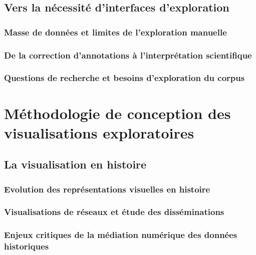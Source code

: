 \documentclass[a4paper,12pt,twoside]{book}
\newcommand{\clearemptydoublepage}{\newpage{\pagestyle{empty}\cleardoublepage}}
\begin{document}
	\clearemptydoublepage
	
	\chapter{Vers la nécessité d'interfaces d'exploration}
	\section{Masse de données et limites de l'exploration manuelle}
	
	
	\section{De la correction d'annotations à l'interprétation scientifique}
	
	
	\section{Questions de recherche et besoins d'exploration du corpus}
	
	
	\clearemptydoublepage
	
	
	\part{Méthodologie de conception des visualisations exploratoires}
	\chapter{La visualisation en histoire}
	\section{Evolution des représentations visuelles en histoire}
	
	
	\section{Visualisations de réseaux et étude des disséminations}
	
	
	\section{Enjeux critiques de la médiation numérique des données historiques}
	
	
	\clearemptydoublepage
	
\end{document}

